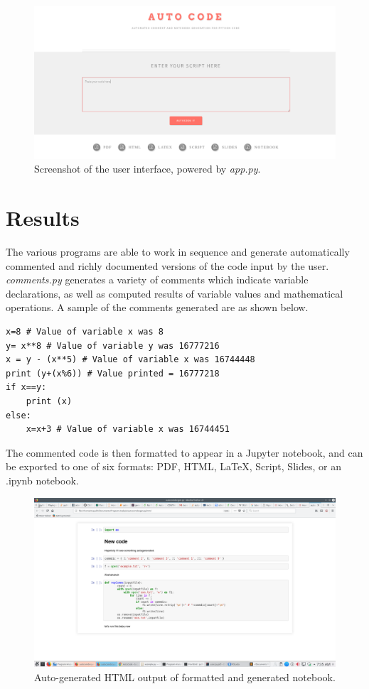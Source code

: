 \documentclass[fleqn,10pt]{wlscirep}
\begin{document}
\begin{figure}[h!]
\centering
\includegraphics[width=\linewidth, frame]{screenshot}
\caption{Screenshot of the user interface, powered by \textit{app.py}.}
\label{fig:screenshot}
\end{figure}

\section*{Results}
The various programs are able to work in sequence and generate automatically commented and richly documented versions of the code input by the user. \textit{comments.py} generates a variety of comments which indicate variable declarations, as well as computed results of variable values and mathematical operations. A sample of the comments generated are as shown below.

\begin{verbatim}
x=8 # Value of variable x was 8
y= x**8 # Value of variable y was 16777216
x = y - (x**5) # Value of variable x was 16744448
print (y+(x%6)) # Value printed = 16777218
if x==y:
    print (x)
else:
    x=x+3 # Value of variable x was 16744451
\end{verbatim}

The commented code is then formatted to appear in a Jupyter notebook, and can be exported to one of six formats: PDF, HTML, \LaTeX, Script, Slides, or an .ipynb notebook.

\begin{figure}[h!]
\centering
\includegraphics[width=\linewidth]{notebook}
\caption{Auto-generated HTML output of formatted and generated notebook.}
\label{fig:notebook}
\end{figure}
\end{document}

